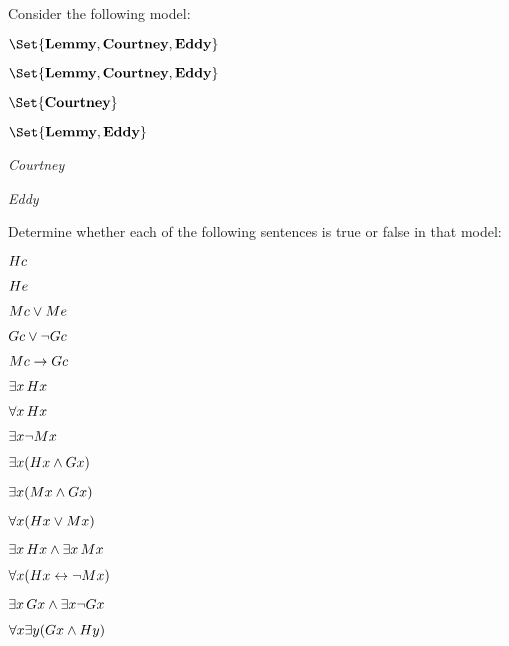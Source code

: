 \begin{practiceproblems}
\problempart
\label{pr.TorF2}
Consider the following model:	
\begin{interp}
	\item[\domain]$\Set{\emph{Lemmy}, \emph{Courtney}, \emph{Eddy}}$
\item[\denote{G}] $\Set{\emph{Lemmy}, \emph{Courtney}, \emph{Eddy}}$
\item[\denote{H}] $\Set{\emph{Courtney}}$
\item[\denote{M}] $\Set{\emph{Lemmy}, \emph{Eddy}}$
\item[\denote{c}] \emph{Courtney}
\item[\denote{e}] \emph{Eddy}
\end{interp}
Determine whether each of the following sentences is true or false in that model:
\begin{earg}
\item $\mathord{H}c$ \hfill {}
\item $\mathord{H}e$\hfill {}
\item $\mathord{M}c \vee \mathord{M}e$ \hfill {}
\item $\mathord{G}c \vee \neg \mathord{G}c$ \hfill {}
\item $\mathord{M}c \rightarrow \mathord{G}c$ \hfill {}
\item $\exists x\,\mathord{H}x$ \hfill {}
\item $\forall x\,\mathord{H}x$ \hfill {}
\item $\exists x \neg \mathord{M}x$ \hfill {}
\item $\exists x(\mathord{H}x \mathbin{\wedge} \mathord{G}x)$ \hfill {}
\item $\exists x(\mathord{M}x \mathbin{\wedge} \mathord{G}x)$ \hfill {}
\item $\forall x(\mathord{H}x \vee \mathord{M}x)$ \hfill {}
\item $\exists x\,\mathord{H}x \mathbin{\wedge} \exists x\,\mathord{M}x$ \hfill {}
\item $\forall x(\mathord{H}x \leftrightarrow \neg \mathord{M}x)$ \hfill {}
\item $\exists x\,\mathord{G}x \mathbin{\wedge} \exists x \neg \mathord{G}x$ \hfill {}
\item $\forall x\exists y(\mathord{G}x \mathbin{\wedge} \mathord{H}y)$ \hfill {}
\end{earg}


\end{practiceproblems}
